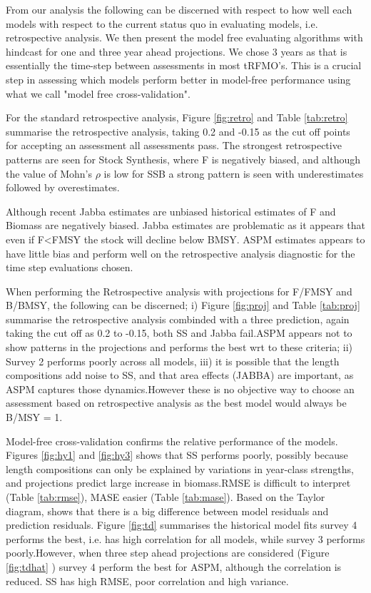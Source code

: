 From our analysis the following can be discerned with respect to how well each models with respect to the current status quo in evaluating models, i.e. retrospective analysis. We then present the model free evaluating algorithms with hindcast for one and three year ahead projections. We chose 3 years as that is essentially the time-step between assessments in most tRFMO's. This is a crucial step in assessing which models perform better in model-free performance using what we call "model free cross-validation".

For the standard retrospective analysis,    Figure \ref{fig:retro} and Table \ref{tab:retro} summarise the retrospective analysis, taking 0.2 and -0.15 as the cut off points for accepting an assessment all assessments pass. The strongest retrospective patterns are seen for Stock Synthesis, where F is negatively biased, and although the value of Mohn's $\rho$ is low for SSB a strong pattern is seen with underestimates followed by overestimates. 

Although recent Jabba estimates are unbiased historical estimates of F and Biomass are negatively biased. Jabba estimates are problematic as it appears that even if F<FMSY the stock will decline below BMSY. ASPM estimates appears to have little bias and perform well on the retrospective analysis diagnostic for the time step evaluations chosen.

When performing the Retrospective analysis with projections for F/FMSY and B/BMSY, the following can be discerned; i) Figure \ref{fig:proj} and Table \ref{tab:proj} summarise the retrospective analysis combinded with a three prediction, again taking the cut off as 0.2 to -0.15, both SS and Jabba fail.ASPM appears not to show patterns in the projections and performs the best wrt to these criteria; ii) Survey 2 performs poorly across all models, iii) it is possible that the length compositions add noise to SS, and that area effects (JABBA) are important, as ASPM captures those dynamics.However these is no objective way to choose an assessment based on retrospective analysis as the best model would always be B/MSY = 1.

Model-free cross-validation confirms the relative performance of the models. Figures \ref{fig:hy1} and \ref{fig:hy3} shows that SS performs poorly, possibly because length compositions can only be explained by variations in year-class strengths, and projections predict large increase in biomass.RMSE is difficult to interpret (Table \ref{tab:rmse}), MASE easier (Table \ref{tab:mase}). Based on the Taylor diagram, shows that there is a big difference between model residuals and prediction residuals. Figure \ref{fig:td} summarises the historical model fits survey 4 performs the best, i.e. has high correlation for all models, while survey 3 performs poorly.However, when three step ahead projections are considered (Figure \ref{fig:tdhat} ) survey 4 perform the best for ASPM, although the correlation is reduced. SS has high RMSE, poor correlation and high  variance.  

